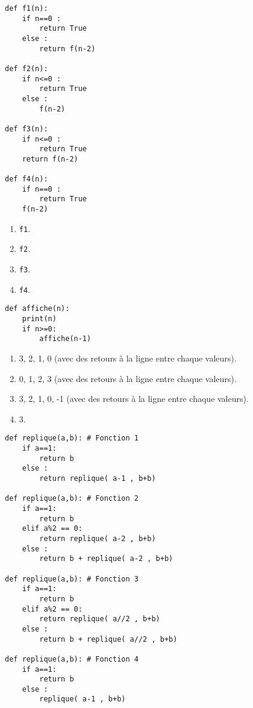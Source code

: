 \begin{lstlisting}
def f1(n):
    if n==0 :
        return True
    else :
        return f(n-2)
        
def f2(n):
    if n<=0 :
        return True
    else :
        f(n-2)
        
def f3(n):
    if n<=0 :
        return True
    return f(n-2)

def f4(n):
    if n==0 :
        return True
    f(n-2)
\end{lstlisting}


\begin{enumerate}
\item \texttt{f1}.
\item \texttt{f2}.
\item \texttt{f3}. %
\item \texttt{f4}.
\end{enumerate}

\begin{lstlisting}
def affiche(n):
    print(n)
    if n>=0:
        affiche(n-1)
\end{lstlisting}

\begin{enumerate}
\item 3, 2, 1, 0 (avec des retours à la ligne entre chaque valeurs).
\item 0, 1, 2, 3 (avec des retours à la ligne entre chaque valeurs).
\item 3, 2, 1, 0, -1 (avec des retours à la ligne entre chaque valeurs). %
\item 3.
\end{enumerate}

\begin{lstlisting}
def replique(a,b): # Fonction 1
    if a==1:
        return b
    else :
        return replique( a-1 , b+b)

def replique(a,b): # Fonction 2
    if a==1:
        return b
    elif a%2 == 0:
        return replique( a-2 , b+b)
    else :
        return b + replique( a-2 , b+b)

def replique(a,b): # Fonction 3
    if a==1:
        return b
    elif a%2 == 0:
        return replique( a//2 , b+b)
    else :
        return b + replique( a//2 , b+b)

def replique(a,b): # Fonction 4
    if a==1:
        return b
    else :
        replique( a-1 , b+b)
\end{lstlisting}

